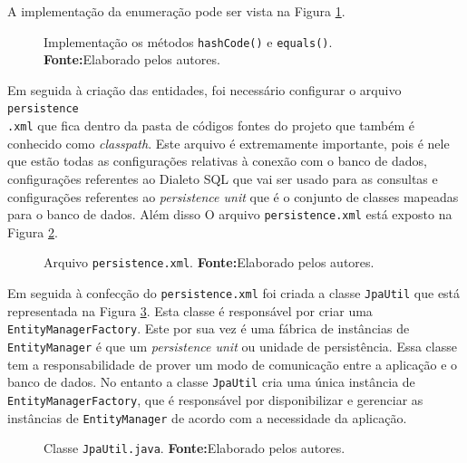 	\par A implementação da enumeração pode ser vista na Figura \ref{fig:desws15}.

	\begin{figure}[h!]
		
		\caption[Implementação os métodos hashCode() e equals()]{Implementação os
		métodos \texttt{hashCode()} e \texttt{equals()}.
			\textbf{Fonte:}Elaborado pelos autores.}
		\label{fig:desws15}
	\end{figure}

	\par Em seguida à criação das entidades, foi necessário configurar o arquivo
\texttt{persistence\\.xml} que fica dentro da pasta de códigos fontes do
projeto que também é conhecido como \textit{classpath}. Este arquivo é extremamente importante, pois é nele que estão todas
as configurações relativas à conexão com o banco de dados, configurações
referentes ao Dialeto SQL que vai ser usado para as consultas e configurações
referentes ao \textit{persistence unit} que é o conjunto de classes mapeadas
para o banco de dados. Além disso 	O arquivo \texttt{persistence.xml} está
exposto na Figura \ref{fig:qm15}.

	\begin{figure}[h!]
		
		\caption[Arquivo \texttt{persistence.xml}]{Arquivo \texttt{persistence.xml}.
		\textbf{Fonte:}Elaborado pelos autores.}
		\label{fig:qm15}
	\end{figure}
	
	\pagebreak
	
	\par Em seguida à confecção do \texttt{persistence.xml} foi criada a
classe \texttt{JpaUtil} que está representada na Figura \ref{fig:qm12}.
Esta classe é responsável por criar uma \texttt{EntityManagerFactory}. Este por
sua vez é uma  fábrica de instâncias de \texttt{EntityManager} é que um
\textit{persistence unit} ou unidade de persistência. Essa classe tem a
responsabilidade de prover um modo de comunicação entre a aplicação e o banco
de dados. No entanto a classe \texttt{JpaUtil} cria uma única instância de
\texttt{EntityManagerFactory}, que é responsável por disponibilizar e gerenciar
as instâncias de \texttt{EntityManager} de acordo com a necessidade da
aplicação.
	
	\begin{figure}[h!]
		
		\caption[Classe \texttt{JpaUtil.java}]{Classe \texttt{JpaUtil.java}.
		\textbf{Fonte:}Elaborado pelos autores.}
		\label{fig:qm12}
	\end{figure}

